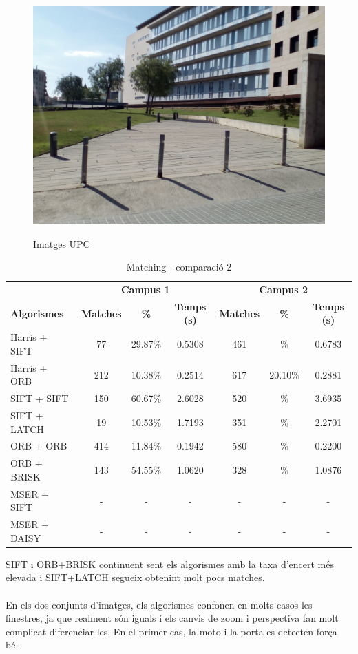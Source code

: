 \begin{figure}[!htb]
				\label{fig:awesome_image3}
			\endminipage\hfill
				\includegraphics[width=\linewidth]{images/experiments/uni4}
				\label{fig:awesome_image3}
			\endminipage
			\caption{Imatges UPC}
		\end{figure}

		\begin{table}[H]
			\begin{center}
				\begin{tabular}{l | c c c | c c c}
					& \multicolumn{3}{c|}{\textbf{Campus 1}} & \multicolumn{3}{c}{\textbf{Campus 2}} \\
					\textbf{Algorismes} & \textbf{Matches} & \textbf{\%} & \textbf{Temps (s)} & \textbf{Matches} & \textbf{\%} & \textbf{Temps (s)} \\ \hline
					Harris + SIFT & 77 & 29.87\% & 0.5308 & 461 & \% & 0.6783 \\
					Harris + ORB & 212 & 10.38\% & 0.2514 & 617 & 20.10\% & 0.2881 \\
					SIFT + SIFT & 150 & 60.67\% & 2.6028 & 520 & \% & 3.6935 \\
					SIFT + LATCH & 19 & 10.53\% & 1.7193 & 351 & \% & 2.2701 \\
					ORB + ORB & 414 & 11.84\% & 0.1942 & 580 & \% & 0.2200 \\
					ORB + BRISK & 143 & 54.55\% & 1.0620 & 328 & \% & 1.0876 \\
					MSER + SIFT & - & - & - & - & - & - \\
					MSER + DAISY & - & - & - & - & - & - \\
				\end{tabular}
			\end{center}
			\caption{Matching - comparació 2}
		\end{table}
		\noindent
		SIFT i ORB+BRISK continuent sent els algorismes amb la taxa d'encert més elevada i SIFT+LATCH segueix obtenint molt pocs matches.\\\\
		En els dos conjunts d'imatges, els algorismes confonen en molts casos
		les finestres, ja que realment són iguals i els canvis de zoom i perspectiva fan molt complicat diferenciar-les. En el primer cas, la moto i la porta es detecten força bé.

